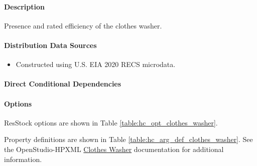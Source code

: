 \paragraph{Description}
% 
Presence and rated efficiency of the clothes washer.

\paragraph{Distribution Data Sources}
% 
\begin{itemize}
\item 
Constructed using U.S. EIA 2020 RECS microdata.
\end{itemize}

\paragraph{Direct Conditional Dependencies}


\paragraph{Options}
ResStock options are shown in Table \ref{table:hc_opt_clothes_washer}.



Property definitions are shown in Table \ref{table:hc_arg_def_clothes_washer}. See the OpenStudio-HPXML \href{https://openstudio-hpxml.readthedocs.io/en/v1.10.0/workflow_inputs.html#hpxml-clothes-washer}{Clothes Washer} documentation for additional information.



